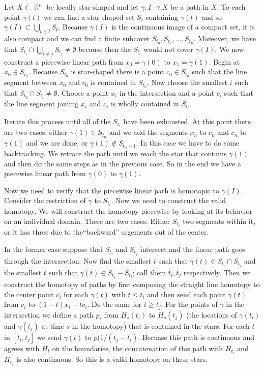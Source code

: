 \documentclass{article}
\DeclareMathOperator{\R}{\mathbb{R}}
\begin{document}
Let $X \subset \R^n$ be locally star-shaped and let $\gamma: I \to X$
be a path in $X$. To each point $\gamma(t)$ we can find a star-shaped
set $S_t$ containing $\gamma(t)$ and so $\gamma(I) \subset
\bigcup_{t\in I} S_t$. Because $\gamma(I)$ is the continuous image of
a compact set, it is also compact and we can find a finite subcover
$S_{t_0}, S_{t_2}, \ldots, S_{t_n}$. Moreover, we have that $S_{t_i}
\cap \bigcup_{i\neq j}S_{t_{j}} \neq \emptyset$ because then the
$S_{t_i}$ would not cover $\gamma(I)$. We now construct a piecewise
linear path from $x_0 = \gamma(0)$ to $x_1 = \gamma(1)$. Begin at $x_0
\in S_{t_0}$. Because $S_{t_0}$ is star-shaped there is a point
$c_0\in S_{t_0}$ such that the line segment between $x_0$ and $c_0$ is
contained in $S_{t_0}$. Now choose the smallest $i$ such that $S_{t_0}
\cap S_{t_i} \neq \emptyset$. Choose a point $x_i$ in the intersection
and a point $c_i$ such that the line segment joining $x_i$ and $c_i$
is wholly contained in $S_{t_i}$.

Iterate this process until all of the $S_{t_i}$ have been
exhausted. At this point there are two cases: either $\gamma(1) \in
S_{t_n}$ and we add the segments $x_{n}$ to $c_n$ and $c_n$ to
$\gamma(1)$ and we are done, or $\gamma(1) \not\in S_{t_n-1}$. In this
case we have to do some backtracking. We retrace the path until we
reach the star that contains $\gamma(1)$ and then do the same steps as
in the previous case. So in the end we have a piecewise linear path
from $\gamma(0)$ to $\gamma(1)$.

Now we need to verify that the piecewise linear path is homotopic to
$\gamma(I)$. Consider the restriction of $\gamma$ to $S_{t_i}$. Now we
need to construct the valid homotopy. We will construct the homotopy
piecewise by looking at its behavior on an individual domain. There
are two cases: Either $S_{t_i}$ two segments within it, or it has
three due to the``backward'' segements out of the center.

In the former case suppose that $S_{t_i}$ and $S_{t_j}$ intersect and
the linear path goes through the intersection. Now find the smallest
$t$ such that $\gamma(t) \in S_{t_i}\cap S_{t_j}$ and the smallest $t$
such that $\gamma(t) \in S_{t_j} - S_{t_i}$; call them $t_i,t_j$
respectively. Then we construct the homotopy of paths by first
composing the straight line homotopy to the center point $c_i$ for
each $\gamma(t)$ with $t \leq t_i$ and then send each point
$\gamma(t)$ from $c_i$ to $(1-t)x_i + tc_i$. Do the same for $t \geq
t_j$. For the points of $\gamma$ in the intersection we define a path
$p_i$ from $H_s(t_i)$ to $H_s(t_j)$ (the locations of $\gamma(t_i)$
and $\gamma(t_j)$ at time $s$ in the homotopy) that is contained in
the stars. For each $t$ in $[t_i,t_j]$ we send $\gamma(t)$ to
$p(1/(t_j-t_i)$. Becuase this path is continuous and agrees with $H_t$
on the boundaries, the concatenation of this path with $H_{t_i}$ and
$H_{t_j}$ is also continuous. So this is a valid homotopy on these
stars.
\end{document}
